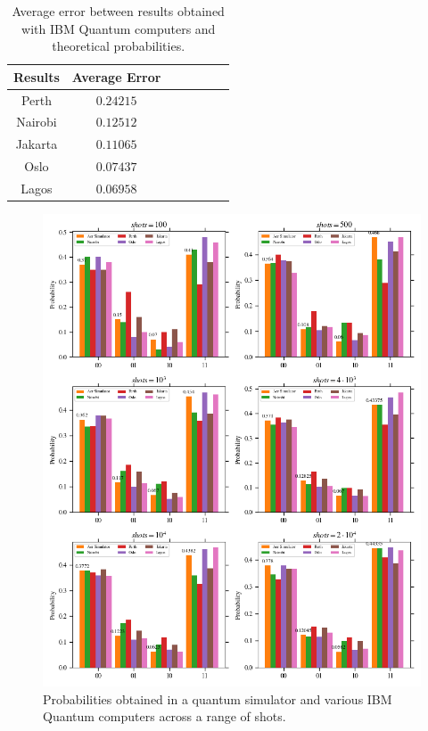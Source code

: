 \begin{table}[!ht]
    \centering
    {\renewcommand{\arraystretch}{1.2}%
    \begin{tabular}{c|cccccc}
    \hline
        Results & Average Error \\ \hline
        Perth & $\scriptstyle0.24215$  \\ 
        Nairobi & $\scriptstyle0.12512$  \\ 
        Jakarta & $\scriptstyle0.11065$  \\ 
        Oslo & $\scriptstyle0.07437$  \\ 
        Lagos & $\scriptstyle0.06958$ \\ \hline
    \end{tabular}}
    \caption{Average error between results obtained with IBM Quantum computers and theoretical probabilities.}
\end{table}

\begin{figure}[h!]
\centering
\includegraphics[width=\textwidth]{images/quantum_benchmark_probabilities.png}
\caption{Probabilities obtained in a quantum simulator and various IBM Quantum computers across a range of shots.}
\label{fig:quantum_benchmark_probabilities}
\end{figure}


